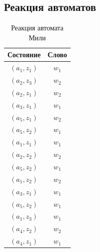         \subsection*{Реакция автоматов}
        \begin{table}[!h]
        \centering
            \begin{tabular}{|c|c|}
                \hline
                Состояние   & Слово \\ \hline
                $(a_1,z_1)$ & $w_1$ \\ \hline
                $(a_2,z_3)$ & $w_2$ \\ \hline
                $(a_2,z_1)$ & $w_2$ \\ \hline
                $(a_3,z_1)$ & $w_1$ \\ \hline
                $(a_5,z_1)$ & $w_2$ \\ \hline
                $(a_5,z_2)$ & $w_1$ \\ \hline
                $(a_1,z_1)$ & $w_1$ \\ \hline
                $(a_2,z_2)$ & $w_2$ \\ \hline
                $(a_5,z_2)$ & $w_1$ \\ \hline
                $(a_1,z_2)$ & $w_2$ \\ \hline
                $(a_3,z_1)$ & $w_1$ \\ \hline
                $(a_5,z_2)$ & $w_1$ \\ \hline
                $(a_1,z_3)$ & $w_1$ \\ \hline
                $(a_4,z_2)$ & $w_2$ \\ \hline
                $(a_4,z_1)$ & $w_1$ \\ \hline
            \end{tabular}
            \caption{Реакция автомата Мили}
        \end{table}
